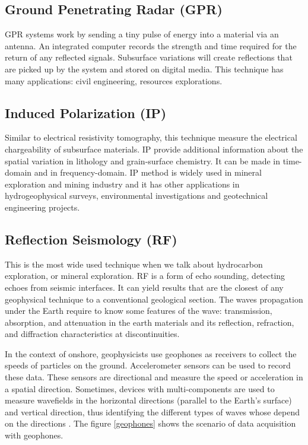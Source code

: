 \subsection{Ground Penetrating Radar (GPR)} GPR systems work by sending a tiny pulse of energy into a material via an antenna. An integrated computer records the strength and time required for the return of any reflected signals. Subsurface variations will create reflections that are picked up by the system and stored on digital media. This technique has many applications: civil engineering, resources explorations.  

\subsection{Induced Polarization (IP)} Similar to electrical resistivity tomography, this technique measure the electrical chargeability of subsurface materials. IP provide additional information about the spatial variation in lithology and grain-surface chemistry. It can be made in time-domain and in frequency-domain.  IP method is widely used in mineral exploration and mining industry and it has other applications in hydrogeophysical surveys, environmental investigations and geotechnical engineering projects.
 
\subsection{Reflection Seismology (RF)} This is the most wide used technique when we talk about hydrocarbon exploration, or mineral exploration. RF is a form of echo sounding, detecting echoes from seismic interfaces. It can yield results that are the closest of any geophysical technique to a conventional geological section. The waves propagation under the Earth require to know some features of the wave: transmission, absorption, and attenuation in the earth materials and its reflection, refraction, and diffraction characteristics
at discontinuities.   

In the context of onshore, geophysicists use geophones as receivers to collect the speeds of particles on the ground. Accelerometer sensors can be used to record these data. These sensors are directional and measure the speed or acceleration in a spatial direction. Sometimes, devices with multi-components are used to measure wavefields in the horizontal directions (parallel to the Earth's surface) and vertical direction, thus identifying the different types of waves whose depend on the directions \cite{BROSSIERPhD}. The figure \ref{geophones} shows the scenario of data acquisition with geophones.  

